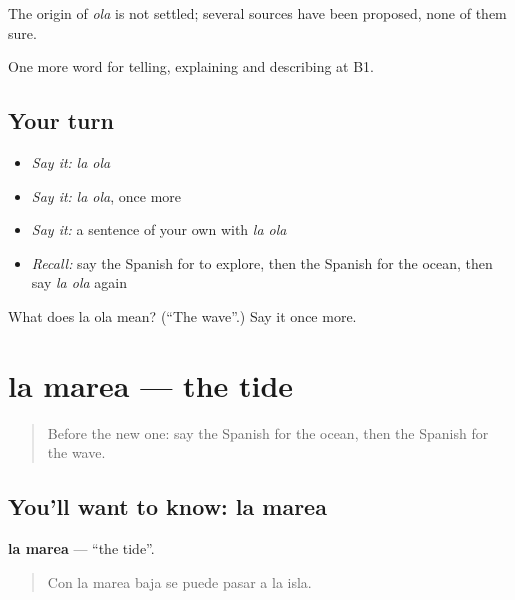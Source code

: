 \begin{cousinweb}
The origin of \emph{ola} is not settled; several sources have been proposed, none of them sure.
\end{cousinweb}

\begin{grammarlens}[title={What you've built}]
One more word for telling, explaining and describing at B1.
\end{grammarlens}

\subsection*{Your turn}
\begin{itemize}
\raggedright
  \item \emph{Say it:} \emph{la ola}
  \item \emph{Say it:} \emph{la ola}, once more
  \item \emph{Say it:} a sentence of your own with \emph{la ola}
  \item \emph{Recall:} say the Spanish for to explore, then the Spanish for the ocean, then say \emph{la ola} again
\end{itemize}

\begin{tcolorbox}[breakable,colback=teal!4,colframe=teal!35!black,title={Before you move on}]
What does la ola mean? (\textquotedblleft{}The wave\textquotedblright{}.) Say it once more.
\end{tcolorbox}
\section[la marea]{la marea — the tide}

\label{lesson:ES-C688-marea}



\begin{quote}
Before the new one: say the Spanish for the ocean, then the Spanish for the wave.
\end{quote}

\subsection*{You'll want to know: la marea}
\textbf{la marea} — \textquotedblleft{}the tide\textquotedblright{}.

\begin{quote}
Con la marea baja se puede pasar a la isla.
\end{quote}

